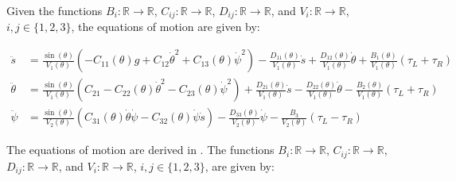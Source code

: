 	Given the functions $B_i: \mathbb{R} \rightarrow \mathbb{R}$, $C_{ij}: \mathbb{R} \rightarrow \mathbb{R}$, $D_{ij}: \mathbb{R} \rightarrow \mathbb{R}$, and $V_i: \mathbb{R} \rightarrow \mathbb{R}$, $i,j \in \{1,2,3\}$, the equations of motion are given by:

	\begin{align}
		\ddot{s} &= \frac{\sin(\theta)}{V_1(\theta)} \left( -C_{11}(\theta)g + C_{12}\dot{\theta}^2 + C_{13}(\theta)\dot{\psi}^2 \right) - \frac{D_{11}(\theta)}{V_1(\theta)}\dot{s} + \frac{D_{12}(\theta)}{V_1(\theta)}\dot{\theta} + \frac{B_{1}(\theta)}{V_1(\theta)}(\tau_L + \tau_R) \\
		\ddot{\theta} &= \frac{\sin(\theta)}{V_1(\theta)} \left( C_{21} - C_{22}(\theta)\dot{\theta}^2 - C_{23}(\theta)\dot{\psi}^2 \right) + \frac{D_{21}(\theta)}{V_1(\theta)}\dot{s} - \frac{D_{22}(\theta)}{V_1(\theta)}\dot{\theta} - \frac{B_{2}(\theta)}{V_1(\theta)}(\tau_L + \tau_R)  \\
		\ddot{\psi} &= \frac{\sin(\theta)}{V_2(\theta)} \left( C_{31}(\theta)\dot{\theta}\dot{\psi} - C_{32}(\theta)\dot{\psi}\dot{s} \right) - \frac{D_{33}(\theta)}{V_2(\theta)}\dot{\psi} - \frac{B_{3}}{V_2(\theta)}(\tau_L - \tau_R)
	\end{align}


	The equations of motion are derived in \cite{kim2015dynamic}. The functions $B_i: \mathbb{R} \rightarrow \mathbb{R}$, $C_{ij}: \mathbb{R} \rightarrow \mathbb{R}$, $D_{ij}: \mathbb{R} \rightarrow \mathbb{R}$, and $V_i: \mathbb{R} \rightarrow \mathbb{R}$, $i,j \in \{1,2,3\}$, are given by:

